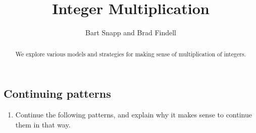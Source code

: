 \documentclass[nooutcomes]{ximera}
\title{Integer Multiplication}
\author{Bart Snapp and Brad Findell}
\begin{document}
\begin{abstract}
We explore various models and strategies for 
making sense of multiplication of integers.  
\end{abstract}
\maketitle

\label{A:integerMultiplication}



\subsection*{Continuing patterns}
\begin{problem}
\begin{enumerate}
\item Continue the following patterns, and explain why it makes sense to continue them in that way.    


\end{enumerate}
\end{problem}
\end{document}

